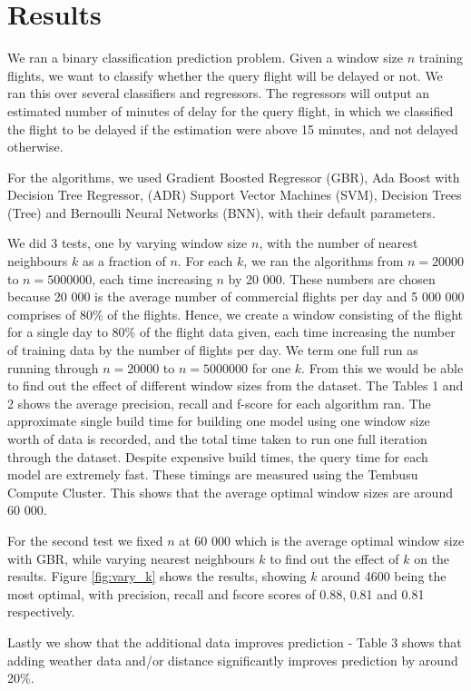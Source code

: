 \documentclass[letterpaper,11pt]{article}
\begin{document}
\section{Results}
We ran a binary classification prediction problem. Given a window size $n$ training flights, we want to classify whether the query flight will be delayed or not. We ran this over several classifiers and regressors. The regressors will output an estimated number of minutes of delay for the query flight, in which we classified the flight to be delayed if the estimation were above 15 minutes, and not delayed otherwise. 

For the algorithms, we used Gradient Boosted Regressor (GBR), Ada Boost with Decision Tree Regressor, (ADR) Support Vector Machines (SVM), Decision Trees (Tree) and Bernoulli Neural Networks (BNN), with their default parameters. 

We did 3 tests, one by varying window size $n$, with the number of nearest neighbours $k$ as a fraction of $n$. For each $k$, we ran the algorithms from $n = 20 000$ to $n = 5 000 000$, each time increasing $n$ by 20 000. These numbers are chosen because 20 000 is the average number of commercial flights per day and 5 000 000 comprises of 80\% of the flights. Hence, we create a window consisting of the flight for a single day to 80\% of the flight data given, each time increasing the number of training data by the number of flights per day. We term one full run as running through $n = 20 000$ to $n = 5 000 000$ for one $k$. From this we would be able to find out the effect of different window sizes from the dataset. The Tables 1 and 2 shows the average precision, recall and f-score for each algorithm ran. The approximate single build time for building one model using one window size worth of data is recorded, and the total time taken to run one full iteration through the dataset. Despite expensive build times, the query time for each model are extremely fast. These timings are measured using the Tembusu Compute Cluster. This shows that the average optimal window sizes are around 60 000.

For the second test we fixed $n$ at 60 000 which is the average optimal window size with GBR, while varying nearest neighbours $k$ to find out the effect of $k$ on the results. Figure \ref{fig:vary_k} shows the results, showing $k$ around 4600 being the most optimal, with precision, recall and fscore scores of 0.88, 0.81 and 0.81 respectively.

Lastly we show that the additional data improves prediction - Table 3 shows that adding weather data and/or distance significantly improves prediction by around 20\%.
\end{document}
